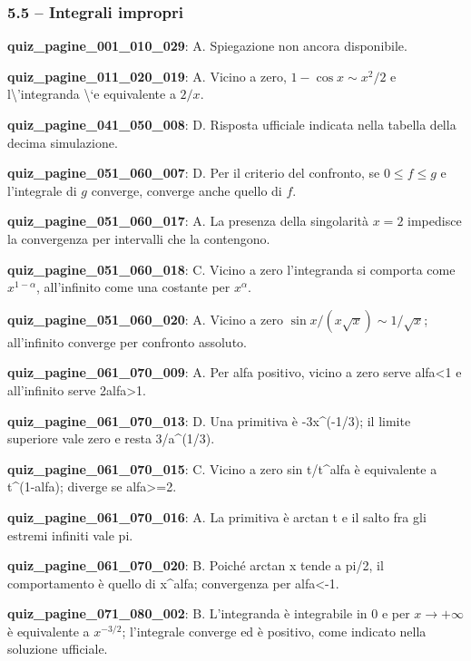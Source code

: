 \documentclass[11pt,a4paper]{article}
\newcounter{quiz}
\begin{document}
\subsubsection*{5.5 -- Integrali impropri}
\noindent\textbf{quiz\_pagine\_001\_010\_029}: A. Spiegazione non ancora disponibile.\par\medskip
\noindent\textbf{quiz\_pagine\_011\_020\_019}: A. Vicino a zero, $1-\cos x\sim x^2/2$ e l\textbackslash{}'integranda \textbackslash{}`e equivalente a $2/x$.\par\medskip
\noindent\textbf{quiz\_pagine\_041\_050\_008}: D. Risposta ufficiale indicata nella tabella della decima simulazione.\par\medskip
\noindent\textbf{quiz\_pagine\_051\_060\_007}: D. Per il criterio del confronto, se $0\le f\le g$ e l'integrale di $g$ converge, converge anche quello di $f$.\par\medskip
\noindent\textbf{quiz\_pagine\_051\_060\_017}: A. La presenza della singolarità $x=2$ impedisce la convergenza per intervalli che la contengono.\par\medskip
\noindent\textbf{quiz\_pagine\_051\_060\_018}: C. Vicino a zero l'integranda si comporta come $x^{1-\alpha}$, all'infinito come una costante per $x^\alpha$.\par\medskip
\noindent\textbf{quiz\_pagine\_051\_060\_020}: A. Vicino a zero $\sin x/(x\sqrt{x})\sim1/\sqrt{x}$; all'infinito converge per confronto assoluto.\par\medskip
\noindent\textbf{quiz\_pagine\_061\_070\_009}: A. Per alfa positivo, vicino a zero serve alfa<1 e all'infinito serve 2alfa>1.\par\medskip
\noindent\textbf{quiz\_pagine\_061\_070\_013}: D. Una primitiva è -3x\textasciicircum{}(-1/3); il limite superiore vale zero e resta 3/a\textasciicircum{}(1/3).\par\medskip
\noindent\textbf{quiz\_pagine\_061\_070\_015}: C. Vicino a zero sin t/t\textasciicircum{}alfa è equivalente a t\textasciicircum{}(1-alfa); diverge se alfa>=2.\par\medskip
\noindent\textbf{quiz\_pagine\_061\_070\_016}: A. La primitiva è arctan t e il salto fra gli estremi infiniti vale pi.\par\medskip
\noindent\textbf{quiz\_pagine\_061\_070\_020}: B. Poiché arctan x tende a pi/2, il comportamento è quello di x\textasciicircum{}alfa; convergenza per alfa<-1.\par\medskip
\noindent\textbf{quiz\_pagine\_071\_080\_002}: B. L'integranda è integrabile in $0$ e per $x\to+\infty$ è equivalente a $x^{-3/2}$; l'integrale converge ed è positivo, come indicato nella soluzione ufficiale.\par\medskip
\end{document}
